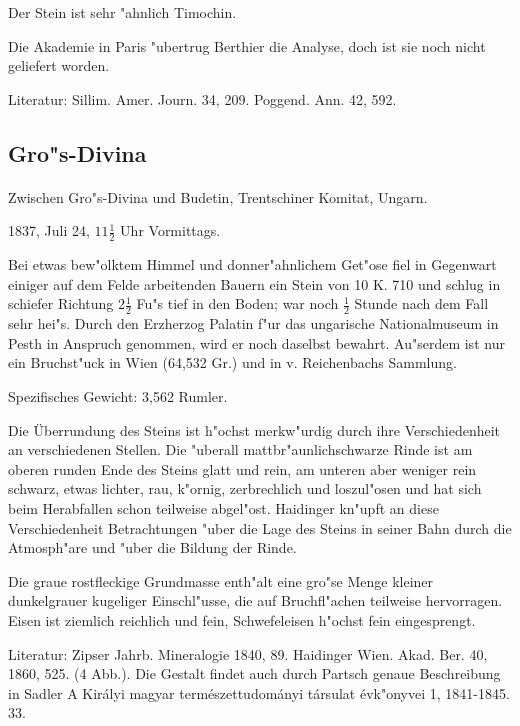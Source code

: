 \documentclass[a4paper, 11pt, oneside]{article}
\begin{document}
Der Stein ist sehr "ahnlich Timochin.

Die Akademie in Paris "ubertrug Berthier die Analyse, doch ist sie noch nicht geliefert worden.

\footnotesize
Literatur: Sillim. Amer. Journ. 34, 209. Poggend. Ann. 42, 592.

\subsection{Gro"s-Divina}
\normalsize
\paragraph{}
Zwischen Gro"s-Divina und Budetin, Trentschiner Komitat, Ungarn.

1837, Juli 24, $11\frac{1}{2}$ Uhr Vormittags.

Bei etwas bew"olktem Himmel und donner"ahnlichem Get"ose fiel in Gegenwart einiger auf dem Felde arbeitenden Bauern ein Stein von 10 K. 710 und schlug in schiefer Richtung $2\frac{1}{2}$ Fu"s tief in den Boden; war noch $\frac{1}{2}$ Stunde nach dem Fall sehr hei"s. Durch den Erzherzog Palatin f"ur das ungarische Nationalmuseum in Pesth in Anspruch genommen, wird er noch daselbst bewahrt. Au"serdem ist nur ein Bruchst"uck in Wien (64,532 Gr.) und in v. Reichenbachs Sammlung.

Spezifisches Gewicht: 3,562 Rumler.

Die Überrundung des Steins ist h"ochst merkw"urdig durch ihre Verschiedenheit an verschiedenen Stellen. Die "uberall mattbr"aunlichschwarze Rinde ist am oberen runden Ende des Steins glatt und rein, am unteren aber weniger rein schwarz, etwas lichter, rau, k"ornig, zerbrechlich und loszul"osen und hat sich beim Herabfallen schon teilweise abgel"ost. Haidinger kn"upft an diese Verschiedenheit Betrachtungen "uber die Lage des Steins in seiner Bahn durch die Atmosph"are und "uber die Bildung der Rinde.

Die graue rostfleckige Grundmasse enth"alt eine gro"se Menge kleiner dunkelgrauer kugeliger Einschl"usse, die auf Bruchfl"achen teilweise hervorragen. Eisen ist ziemlich reichlich und fein, Schwefeleisen h"ochst fein eingesprengt.

\footnotesize
Literatur: Zipser Jahrb. Mineralogie 1840, 89. Haidinger Wien. Akad. Ber. 40, 1860, 525. (4 Abb.). Die Gestalt findet auch durch Partsch genaue Beschreibung in Sadler A Királyi magyar természettudományi társulat évk"onyvei 1, 1841-1845. 33.
\end{document}
